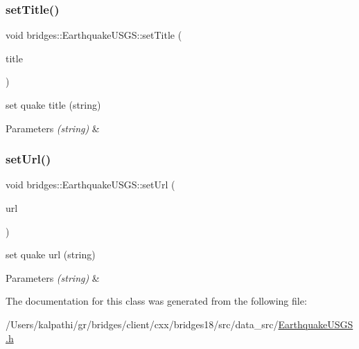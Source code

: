\subsubsection{\texorpdfstring{set\+Title()}{setTitle()}}
{\footnotesize\ttfamily void bridges\+::\+Earthquake\+U\+S\+G\+S\+::set\+Title (\begin{DoxyParamCaption}\item[{const string \&}]{title }\end{DoxyParamCaption})\hspace{0.3cm}{\ttfamily [inline]}}

set quake title (string)


\begin{DoxyParams}{Parameters}
{\em (string)} & \\
\hline
\end{DoxyParams}
\mbox{\label{classbridges_1_1_earthquake_u_s_g_s_a4ee05f6d980ba3101f598c6cfd04fdf2}} 
\subsubsection{\texorpdfstring{set\+Url()}{setUrl()}}
{\footnotesize\ttfamily void bridges\+::\+Earthquake\+U\+S\+G\+S\+::set\+Url (\begin{DoxyParamCaption}\item[{const string \&}]{url }\end{DoxyParamCaption})\hspace{0.3cm}{\ttfamily [inline]}}

set quake url (string)


\begin{DoxyParams}{Parameters}
{\em (string)} & \\
\hline
\end{DoxyParams}


The documentation for this class was generated from the following file\+:\begin{DoxyCompactItemize}
\item 
/\+Users/kalpathi/gr/bridges/client/cxx/bridges18/src/data\+\_\+src/\mbox{\hyperlink{_earthquake_u_s_g_s_8h}{Earthquake\+U\+S\+G\+S.\+h}}\end{DoxyCompactItemize}
